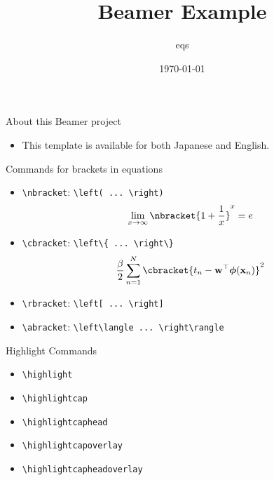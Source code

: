 \documentclass{beamer}
\title{Beamer Example}
\author{eqs}
\date{\today}
\begin{document}
    \begin{frame}[plain]
        \maketitle
    \end{frame}

    \begin{frame}{About this Beamer project}
        \begin{itemize}
            \item This template is available for both Japanese and English.
        \end{itemize}
    \end{frame}

    \begin{frame}[fragile]{Commands for brackets in equations}
        \begin{itemize}
            \item \verb|\nbracket|: \verb|\left( ... \right)|
                \begin{align*}
                    \lim_{x \to \infty} \nbracket{1 + \frac{1}{x}}^x = e
                \end{align*}
            \item \verb|\cbracket|: \verb|\left\{ ... \right\}|
                \begin{align*}
                    \frac{\beta}{2}\sum_{n=1}^N \cbracket{t_n - \mathbf w^\top\boldsymbol\phi(\mathbf x_n)}^2
                \end{align*}
            \item \verb|\rbracket|: \verb|\left[ ... \right]|
            \item \verb|\abracket|: \verb|\left\langle ... \right\rangle|
        \end{itemize}
    \end{frame}

    \begin{frame}[fragile]{Highlight Commands}
        \begin{itemize}
            \item \verb|\highlight|
            \item \verb|\highlightcap|
            \item \verb|\highlightcaphead|
            \item \verb|\highlightcapoverlay|
            \item \verb|\highlightcapheadoverlay|
        \end{itemize}
    \end{frame}
\end{document}
